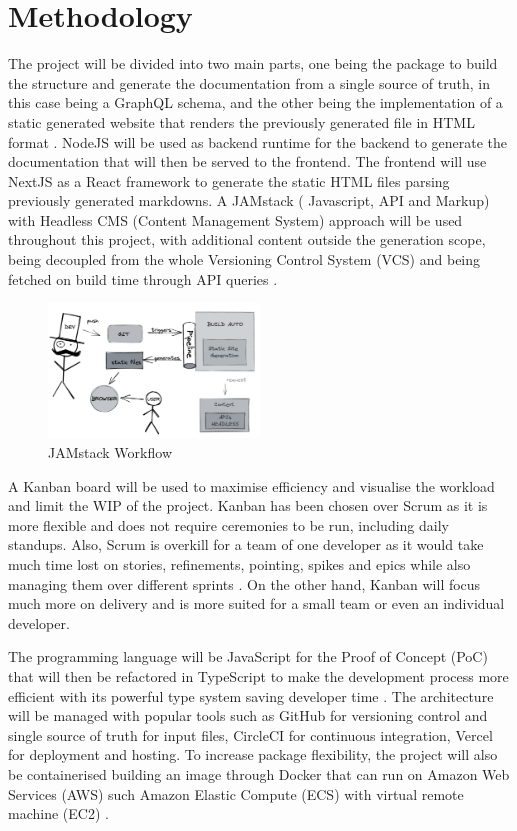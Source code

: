 \section*{Methodology}
\label{s:Methodology}
The project will be divided into two main parts, one being the package to build
the structure and generate the documentation from a single source of truth, in
this case being a GraphQL schema, and the other being the implementation of a
static generated website that renders the previously generated file in HTML
format \citep{gagliardiDjangoRESTMeets2021}. NodeJS will be used as backend
runtime for the backend to generate the documentation that will then be served
to the frontend. The frontend will use NextJS as a React framework to generate
the static HTML files parsing previously generated markdowns. A JAMstack (
Javascript, API and Markup) with Headless CMS (Content Management System)
approach will be used throughout this project, with additional content outside
the generation scope, being decoupled from the whole Versioning Control System
(VCS) and being fetched on build time through API queries
\citep{zammettiWhatJAMstackAll2020}.
\begin{figure}[H]
  \centering
  \includegraphics[width=0.5\textwidth]{figures/jamstack}
  \caption{JAMstack Workflow}
  \label{f:jamstack}
\end{figure}
A Kanban board will be used to maximise efficiency and visualise the workload
and limit the WIP of the project. Kanban has been chosen over Scrum as it is
more flexible and does not require ceremonies to be run, including daily
standups. Also, Scrum is overkill for a team of one developer as it would take
much time lost on stories, refinements, pointing, spikes and epics while also
managing them over different sprints \citep{zayatFrameworkStudyAgile2020}. On
the other hand, Kanban will focus much more on delivery and is more suited for a
small team or even an individual developer.

The programming language will be JavaScript for the Proof of Concept (PoC) that
will then be refactored in TypeScript to make the development process more
efficient with its powerful type system saving developer time
\citep{freemanUnderstandingTypeScript2021}. The architecture will be managed
with popular tools such as GitHub for versioning control and single source of
truth for input files, CircleCI for continuous integration, Vercel for
deployment and hosting. To increase package flexibility, the project will also
be containerised building an image through Docker that can run on Amazon Web
Services (AWS) such Amazon Elastic Compute (ECS) with virtual remote machine
(EC2) \citep{pratapyadavFormalApproachDocker2021}.

